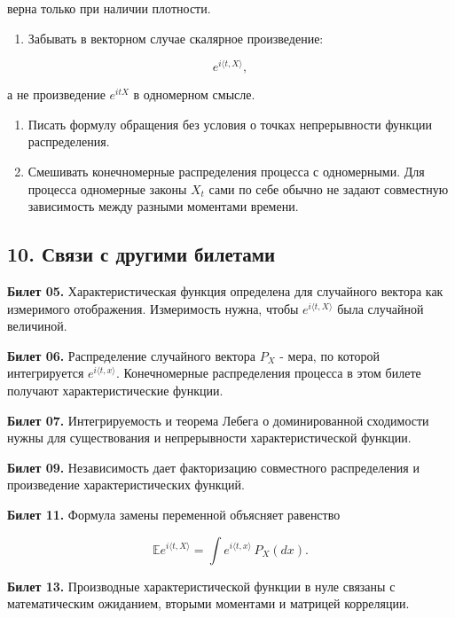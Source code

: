 \documentclass[
  11pt,
  a4paper,
]{article}
\providecommand{\tightlist}{%
  \setlength{\itemsep}{0pt}\setlength{\parskip}{0pt}}
\begin{document}
верна только при наличии плотности.

\begin{enumerate}
\def\labelenumi{\arabic{enumi}.}
\setcounter{enumi}{7}
\tightlist
\item
  Забывать в векторном случае скалярное произведение:
\end{enumerate}

\[
e^{i\langle t,X\rangle},
\]

а не произведение \(e^{itX}\) в одномерном смысле.

\begin{enumerate}
\def\labelenumi{\arabic{enumi}.}
\setcounter{enumi}{8}
\item
  Писать формулу обращения без условия о точках непрерывности функции
  распределения.
\item
  Смешивать конечномерные распределения процесса с одномерными. Для
  процесса одномерные законы \(X_t\) сами по себе обычно не задают
  совместную зависимость между разными моментами времени.
\end{enumerate}

\subsection{10. Связи с другими
билетами}\label{ux441ux432ux44fux437ux438-ux441-ux434ux440ux443ux433ux438ux43cux438-ux431ux438ux43bux435ux442ux430ux43cux438}

\textbf{Билет 05.} Характеристическая функция определена для случайного
вектора как измеримого отображения. Измеримость нужна, чтобы
\(e^{i\langle t,X\rangle}\) была случайной величиной.

\textbf{Билет 06.} Распределение случайного вектора \(P_X\) - мера, по
которой интегрируется \(e^{i\langle t,x\rangle}\). Конечномерные
распределения процесса в этом билете получают характеристические
функции.

\textbf{Билет 07.} Интегрируемость и теорема Лебега о доминированной
сходимости нужны для существования и непрерывности характеристической
функции.

\textbf{Билет 09.} Независимость дает факторизацию совместного
распределения и произведение характеристических функций.

\textbf{Билет 11.} Формула замены переменной объясняет равенство

\[
\mathbb E e^{i\langle t,X\rangle}
=
\int e^{i\langle t,x\rangle}\,P_X(dx).
\]

\textbf{Билет 13.} Производные характеристической функции в нуле связаны
с математическим ожиданием, вторыми моментами и матрицей корреляции.
\end{document}
